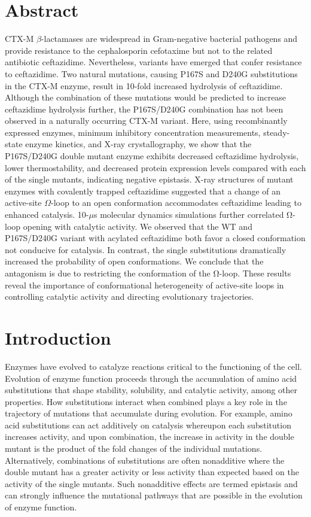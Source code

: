 \documentclass[../main.tex]{subfiles}
\begin{document}
    \section{Abstract}
        CTX-M $\beta$-lactamases are widespread in Gram-negative bacterial pathogens and provide resistance to the cephalosporin cefotaxime but not to the related antibiotic ceftazidime. Nevertheless, variants have emerged that confer resistance to ceftazidime. Two natural mutations, causing P167S and D240G substitutions in the CTX-M enzyme, result in 10-fold increased hydrolysis of ceftazidime. Although the combination of these mutations would be predicted to increase ceftazidime hydrolysis further, the P167S/D240G combination has not been observed in a naturally occurring CTX-M variant. Here, using recombinantly expressed enzymes, minimum inhibitory concentration measurements, steady-state enzyme kinetics, and X-ray crystallography, we show that the P167S/D240G double mutant enzyme exhibits decreased ceftazidime hydrolysis, lower thermostability, and decreased protein expression levels compared with each of the single mutants, indicating negative epistasis. X-ray structures of mutant enzymes with covalently trapped ceftazidime suggested that a change of an active-site $\Omega$-loop to an open conformation accommodates ceftazidime leading to enhanced catalysis. 10-$\mu$s molecular dynamics simulations further correlated Ω-loop opening with catalytic activity. We observed that the WT and P167S/D240G variant with acylated ceftazidime both favor a closed conformation not conducive for catalysis. In contrast, the single substitutions dramatically increased the probability of open conformations. We conclude that the antagonism is due to restricting the conformation of the Ω-loop. These results reveal the importance of conformational heterogeneity of active-site loops in controlling catalytic activity and directing evolutionary trajectories.

    
    \section{Introduction}
        Enzymes have evolved to catalyze reactions critical to the functioning of the cell\cite{knowles_enzyme_1991}. Evolution of enzyme function proceeds through the accumulation of amino acid substitutions that shape stability, solubility, and catalytic activity, among other properties. How substitutions interact when combined plays a key role in the trajectory of mutations that accumulate during evolution\cite{breen_epistasis_2012,de_visser_empirical_2014}. For example, amino acid substitutions can act additively on catalysis whereupon each substitution increases activity, and upon combination, the increase in activity in the double mutant is the product of the fold changes of the individual mutations\cite{wells_additivity_1990}. Alternatively, combinations of substitutions are often nonadditive where the double mutant has a greater activity or less activity than expected based on the activity of the single mutants. Such nonadditive effects are termed epistasis and can strongly influence the mutational pathways that are possible in the evolution of enzyme function\cite{weinreich_darwinian_2006}.
\end{document}
